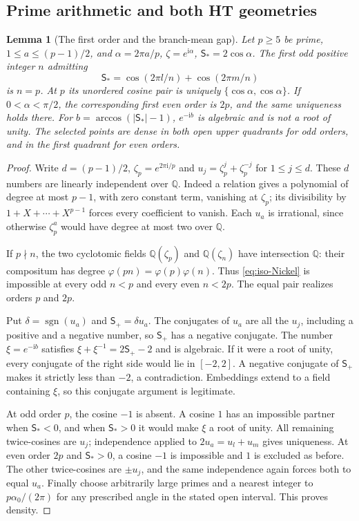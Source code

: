 \documentclass[11pt]{article}
\numberwithin{equation}{section}
\newtheorem{lemma}[theorem]{Lemma}
\theoremstyle{definition}
\newcommand{\ii}{\mathrm i}
\begin{document}
\subsection{Prime arithmetic and both HT geometries}

\begin{lemma}[The first order and the branch-mean gap]
\label{lem:iso-prime-family}
Let $p\ge5$ be prime, $1\le a\le(p-1)/2$, and
$\alpha=2\pi a/p$, $\zeta=e^{\ii\alpha}$,
$\mathsf S_*=2\cos\alpha$.
The first odd positive integer $n$ admitting
\begin{equation}\label{eq:iso-Nickel}
 \mathsf S_* = \cos(2\pi l/n)+\cos(2\pi m/n)
\end{equation}
is $n=p$.  At $p$ its unordered cosine pair is uniquely
$\{\cos\alpha,\cos\alpha\}$.
If $0<\alpha<\pi/2$, the corresponding first even order is $2p$,
and the same uniqueness holds there.
For $b=\arccos(|\mathsf S_*|-1)$, $e^{-\ii b}$ is algebraic and
is not a root of unity.  The selected points are dense in both open
upper quadrants for odd orders, and in the first quadrant for even
orders.
\end{lemma}
\begin{proof}
Write $d=(p-1)/2$, $\zeta_p=e^{2\pi\ii/p}$ and
$u_j=\zeta_p^j+\zeta_p^{-j}$ for $1\le j\le d$.
These $d$ numbers are linearly independent over $\mathbb Q$.
Indeed a relation gives a polynomial of degree at most $p-1$, with
zero constant term, vanishing at $\zeta_p$; its divisibility by
$1+X+\cdots+X^{p-1}$ forces every coefficient to vanish.
Each $u_a$ is irrational, since otherwise $\zeta_p^a$ would have
degree at most two over $\mathbb Q$.

If $p\nmid n$, the two cyclotomic fields
$\mathbb Q(\zeta_p)$ and $\mathbb Q(\zeta_n)$ have intersection
$\mathbb Q$: their compositum has degree
$\varphi(pn)=\varphi(p)\varphi(n)$.
Thus \eqref{eq:iso-Nickel} is impossible at every odd $n<p$ and
every even $n<2p$.  The equal pair realizes orders $p$ and $2p$.

Put $\delta=\operatorname{sgn}(u_a)$ and $\mathsf S_+=\delta u_a$.
The conjugates of $u_a$ are all the $u_j$, including a positive and
a negative number, so $\mathsf S_+$ has a negative conjugate.
The number $\xi=e^{-\ii b}$ satisfies
$\xi+\xi^{-1}=2\mathsf S_+-2$ and is algebraic.
If it were a root of unity, every conjugate of the right side would
lie in $[-2,2]$.  A negative conjugate of $\mathsf S_+$ makes it
strictly less than $-2$, a contradiction.  Embeddings extend to a
field containing $\xi$, so this conjugate argument is legitimate.

At odd order $p$, the cosine $-1$ is absent.  A cosine $1$ has an
impossible partner when $\mathsf S_*<0$, and when $\mathsf S_*>0$
it would make $\xi$ a root of unity.  All remaining twice-cosines
are $u_j$; independence applied to $2u_a=u_l+u_m$ gives uniqueness.
At even order $2p$ and $\mathsf S_*>0$, a cosine $-1$ is impossible
and $1$ is excluded as before.  The other twice-cosines are
$\pm u_j$, and the same independence again forces both to equal
$u_a$.  Finally choose arbitrarily large primes and a nearest
integer to $p\alpha_0/(2\pi)$ for any prescribed angle in the
stated open interval.  This proves density.
\end{proof}
\end{document}
